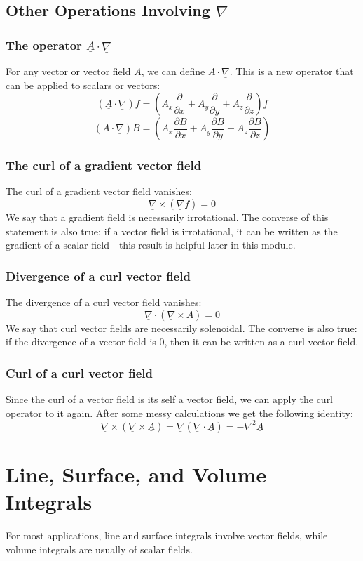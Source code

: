 \documentclass[12pt]{article}
\newcommand{\pf}[2]{\frac{\partial #1}{\partial #2}}
\newcommand{\dive}[1]{\underline{\nabla}\cdot\underline{#1}}
\newcommand{\grad}[1]{\underline{\nabla}#1}
\newcommand{\curl}[1]{\underline{\nabla}\times \underline{#1}}
\begin{document}
\subsection{Other Operations Involving \(\nabla\)}
\subsubsection{The operator \(\underline{A}\cdot \underline{\nabla}\)}
For any vector or vector field \(\underline{A}\), we can define \(\underline{A}\cdot \underline{\nabla}\). This is a new operator that can be applied to scalars or vectors:
\[(\underline{A}\cdot\underline{\nabla})f=\left(A_x\pf{}{x}+A_y\pf{}{y}+A_z\pf{}{z}\right)f\]
\[(\underline{A}\cdot\underline{\nabla})\underline{B}=\left(A_x\pf{\underline{B}}{x}+A_y\pf{\underline{B}}{y}+A_z\pf{\underline{B}}{z}\right)\]
\subsubsection{The curl of a gradient vector field}
The curl of a gradient vector field vanishes:
\[\underline{\nabla}\times (\grad{f})=\underline{0}\]
We say that a gradient field is necessarily irrotational. The converse of this statement is also true: if a vector field is irrotational, it can be written as the gradient of a scalar field - this result is helpful later in this module.
\subsubsection{Divergence of a curl vector field}
The divergence of a curl vector field vanishes:
\[\underline{\nabla}\cdot(\curl{A})=0\]
We say that curl vector fields are necessarily solenoidal. The converse is also true: if the divergence of a vector field is \(0\), then it can be written as a curl vector field.
\subsubsection{Curl of a curl vector field}
Since the curl of a vector field is its self a vector field, we can apply the curl operator to it again. After some messy calculations we get the following identity:
\[\underline{\nabla}\times (\curl{A})=\underline{\nabla}(\dive{A})=-\nabla^2\underline{A}\]
\clearpage
\section{Line, Surface, and Volume Integrals}
For most applications, line and surface integrals involve vector fields, while volume integrals are usually of scalar fields.
\end{document}
